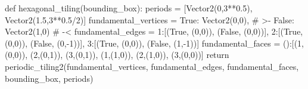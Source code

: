 \documentclass[a4paper]{article}
\begin{document}
\ttfamily
\thispagestyle{empty}
\begin{python}
def hexagonal_tiling(bounding_box):
    periods = [Vector2(0,3**0.5), Vector2(1.5,3**0.5/2)]
    fundamental_vertices = {True: Vector2(0,0),   # >-
                            False: Vector2(1,0)}  # -<
    fundamental_edges = {1:[(True, (0,0)), (False, (0,0))],
                         2:[(True, (0,0)), (False, (0,-1))],
                         3:[(True, (0,0)), (False, (1,-1))]}
    fundamental_faces = {():[(1,(0,0)), (2,(0,1)), (3,(0,1)),
                             (1,(1,0)), (2,(1,0)), (3,(0,0))]}
    return periodic_tiling2(fundamental_vertices,
                            fundamental_edges,
                            fundamental_faces,
                            bounding_box,
                            periods)
\end{python}
\end{document}
